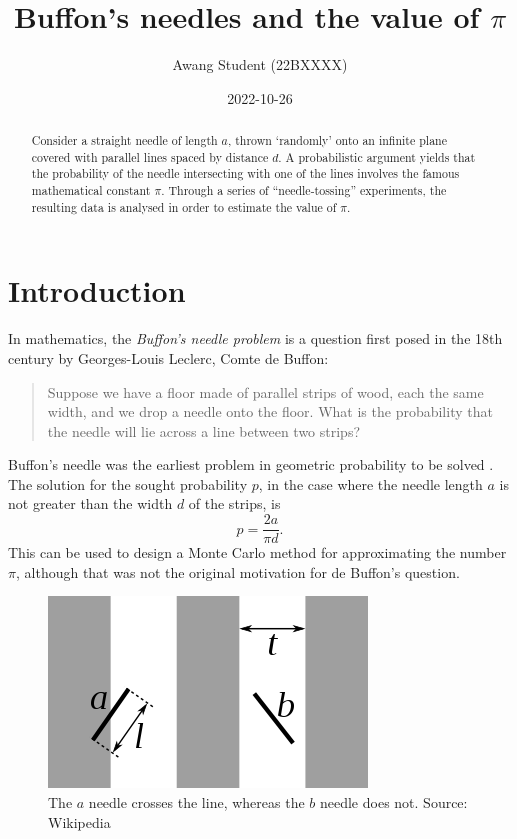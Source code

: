 \documentclass[11pt]{article}
\title{Buffon's needles and the value of $\pi$}
\author{Awang Student (22BXXXX)}
\date{2022-10-26}
\begin{document}
\maketitle

\begin{abstract}
Consider a straight needle of length $a$, thrown `randomly' onto an infinite plane covered with parallel lines spaced by distance $d$. 
A probabilistic argument yields that the probability of the needle intersecting with one of the lines involves the famous mathematical constant $\pi$. 
Through a series of ``needle-tossing'' experiments, the resulting data is analysed in order to estimate the value of $\pi$.
\end{abstract}

\section{Introduction}

In mathematics, the \emph{Buffon's needle problem} is a question first posed in the 18th century by Georges-Louis Leclerc, Comte de Buffon:

\begin{quote}
Suppose we have a floor made of parallel strips of wood, each the same width, and we drop a needle onto the floor. What is the probability that the needle will lie across a line between two strips?
\end{quote}

Buffon's needle was the earliest problem in geometric probability to be solved \cite{weisstein2003buffon}. The solution for the sought probability \(p\), in the case where the needle length \(a\) is not greater than the width \(d\) of the strips, is
\begin{equation}\label{eq:probres}
 p=\frac{2a}{\pi d}.
\end{equation} This can be used to design a Monte Carlo method for approximating the number \(\pi\), although that was not the original motivation for de Buffon's question.

\begin{figure}[htbp]
\centering 
\includegraphics[width=0.4\linewidth]{figure/buffon1.png} 
\caption{The $a$ needle crosses the line, whereas the $b$ needle does not. Source: Wikipedia}
\label{fig:buffon1}
\end{figure}
\end{document}
